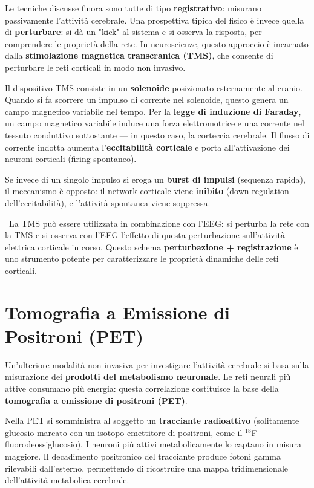 Le tecniche discusse finora sono tutte di tipo \textbf{registrativo}: misurano passivamente l'attività cerebrale. Una prospettiva tipica del fisico è invece quella di \textbf{perturbare}: si dà un "kick" al sistema e si osserva la risposta, per comprendere le proprietà della rete. In neuroscienze, questo approccio è incarnato dalla \textbf{stimolazione magnetica transcranica (TMS)}, che consente di perturbare le reti corticali in modo non invasivo.



Il dispositivo TMS consiste in un \textbf{solenoide} posizionato esternamente al cranio. Quando si fa scorrere un impulso di corrente nel solenoide, questo genera un campo magnetico variabile nel tempo. Per la \textbf{legge di induzione di Faraday}, un campo magnetico variabile induce una forza elettromotrice e una corrente nel tessuto conduttivo sottostante — in questo caso, la corteccia cerebrale. Il flusso di corrente indotta aumenta l'\textbf{eccitabilità corticale} e porta all'attivazione dei neuroni corticali (firing spontaneo).

Se invece di un singolo impulso si eroga un \textbf{burst di impulsi} (sequenza rapida), il meccanismo è opposto: il network corticale viene \textbf{inibito} (down-regulation dell'eccitabilità), e l'attività spontanea viene soppressa.

\
La TMS può essere utilizzata in combinazione con l'EEG: si perturba la rete con la TMS e si osserva con l'EEG l'effetto di questa perturbazione sull'attività elettrica corticale in corso. Questo schema \textbf{perturbazione + registrazione} è uno strumento potente per caratterizzare le proprietà dinamiche delle reti corticali.

\section{Tomografia a Emissione di Positroni (PET)}

Un'ulteriore modalità non invasiva per investigare l'attività cerebrale si basa sulla misurazione dei \textbf{prodotti del metabolismo neuronale}. Le reti neurali più attive consumano più energia: questa correlazione costituisce la base della \textbf{tomografia a emissione di positroni (PET)}.

Nella PET si somministra al soggetto un \textbf{tracciante radioattivo} (solitamente glucosio marcato con un isotopo emettitore di positroni, come il $^{18}$F-fluorodeossiglucosio). I neuroni più attivi metabolicamente lo captano in misura maggiore. Il decadimento positronico del tracciante produce fotoni gamma rilevabili dall'esterno, permettendo di ricostruire una mappa tridimensionale dell'attività metabolica cerebrale.



